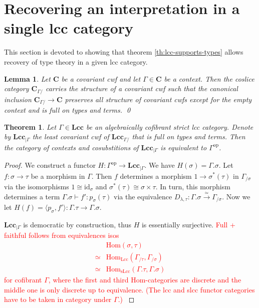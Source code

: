 \documentclass{article}
\newcommand{\todo}[1]{\textcolor{red}{#1}}
\newtheorem{theorem}{Theorem}
\newtheorem{lemma}{Lemma}
\begin{document}
\section{Recovering an interpretation in a single lcc category}

This section is devoted to showing that theorem \ref{th:lcc-supports-types} allows recovery of type theory in a given lcc category.

\begin{lemma}
  Let $\mathbf{C}$ be a covariant cwf and let $\Gamma \in \mathbf{C}$ be a context.
  Then the coslice category $\mathbf{C}_{\Gamma /}$ carries the structure of a covariant cwf such that the canonical inclusion $\mathbf{C}_{\Gamma /} \rightarrow \mathbf{C}$ preserves all structure of covariant cwfs except for the empty context and is full on types and terms.
  \qed
\end{lemma}

\begin{theorem}
  \label{th:context-as-model}
  Let $\Gamma \in \mathbf{Lcc}$ be an algebraically cofibrant strict lcc category.
  Denote by $\mathbf{Lcc}_{| \Gamma}$ the least covariant cwf of $\mathbf{Lcc}_{\Gamma /}$ that is full on types and terms.
  Then the category of contexts and cosubstitions of $\mathbf{Lcc}_{| \Gamma}$ is equivalent to $\Gamma^\mathrm{op}$.
\end{theorem}
\begin{proof}
  We construct a functor $H : \Gamma^\mathrm{op} \rightarrow \mathbf{Lcc}_{| \Gamma}$.
  We have $H(\sigma) = \Gamma.\sigma$.
  Let $f : \sigma \rightarrow \tau$ be a morphism in $\Gamma$.
  Then $f$ determines a morphism $1 \rightarrow \sigma^*(\tau)$ in $\Gamma_{/ \sigma}$ via the isomorphisms $1 \cong \mathrm{id}_\sigma$ and $\sigma^*(\tau) \cong \sigma \times \tau$.
  In turn, this morphism determines a term $\Gamma.\sigma \vdash f' : p_\sigma(\tau)$ via the equivalence $D_{\lambda, \tau} : \Gamma.\sigma \xrightarrow{\simeq} \Gamma_{/ \sigma}$.
  Now we let $H(f) = \langle p_\sigma, f' \rangle : \Gamma.\tau \rightarrow \Gamma.\sigma$.
  
  $\mathbf{Lcc}_{| \Gamma}$ is democratic by construction, thus $H$ is essentially surjective.
  \todo{
    Full + faithful follows from equivalences isos
    \begin{align}
      & \mathrm{Hom}(\sigma, \tau) \\
      \simeq {} & \mathrm{Hom}_\mathrm{Lcc}(\Gamma_{/ \tau} , \Gamma_{/ \sigma}) \\
      \simeq {} & \mathrm{Hom}_\mathrm{sLcc}(\Gamma.\tau, \Gamma.\sigma)
    \end{align}
    for cofibrant $\Gamma$, where the first and third Hom-categories are discrete and the middle one is only discrete up to equivalence.
    (The lcc and slcc functor categories have to be taken in category under $\Gamma$.)
  }
\end{proof}
\end{document}
